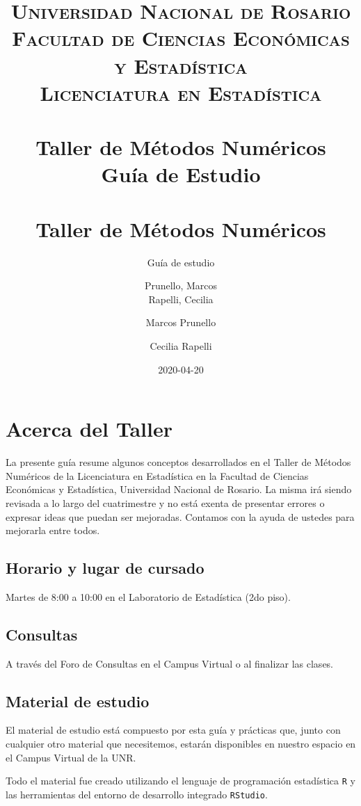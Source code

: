 \documentclass[openany]{book}
\title{
	\usefont{OT1}{bch}{b}{n}
	\normalfont \normalsize
	\textsc{
		Universidad Nacional de Rosario \\
		Facultad de Ciencias Económicas y Estadística \\
		Licenciatura en Estadística
	} \\ [25pt]
	\horrule{2pt} \\[0.4cm]
	\huge \textbf{Taller de Métodos Numéricos} \\
	\bigbreak
	Guía de Estudio\\
	\horrule{2pt} \\[0.5cm]}
\author{
	\normalfont Prunello, Marcos \\
	\normalfont Rapelli, Cecilia
}
\title{Taller de Métodos Numéricos}
\subtitle{Guía de estudio}
\author{Marcos Prunello \and Cecilia Rapelli}
\date{2020-04-20}
\begin{document}
\maketitle

{
\setcounter{tocdepth}{1}
\tableofcontents
}
\hypertarget{acerca-del-taller}{%
\chapter*{Acerca del Taller}\label{acerca-del-taller}}

La presente guía resume algunos conceptos desarrollados en el Taller de Métodos Numéricos de la Licenciatura en Estadística en la Facultad de Ciencias Económicas y Estadística, Universidad Nacional de Rosario. La misma irá siendo revisada a lo largo del cuatrimestre y no está exenta de presentar errores o expresar ideas que puedan ser mejoradas. Contamos con la ayuda de ustedes para mejorarla entre todos.

\hypertarget{horario-y-lugar-de-cursado}{%
\section*{Horario y lugar de cursado}\label{horario-y-lugar-de-cursado}}

Martes de 8:00 a 10:00 en el Laboratorio de Estadística (2do piso).

\hypertarget{consultas}{%
\section*{Consultas}\label{consultas}}

A través del Foro de Consultas en el Campus Virtual o al finalizar las clases.

\hypertarget{material-de-estudio}{%
\section*{Material de estudio}\label{material-de-estudio}}

El material de estudio está compuesto por esta guía y prácticas que, junto con cualquier otro material que necesitemos, estarán disponibles en nuestro espacio en el Campus Virtual de la UNR.

Todo el material fue creado utilizando el lenguaje de programación estadística \texttt{R} y las herramientas del entorno de desarrollo integrado \texttt{RStudio}.
\end{document}
